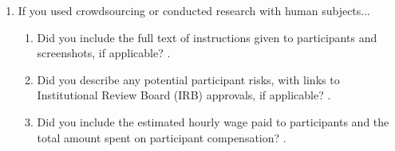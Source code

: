 \begin{enumerate}
\item If you used crowdsourcing or conducted research with human subjects...
\begin{enumerate}
  \item Did you include the full text of instructions given to participants and screenshots, if applicable?
    \answerNA{}.
  \item Did you describe any potential participant risks, with links to Institutional Review Board (IRB) approvals, if applicable?
    \answerNA{}.
  \item Did you include the estimated hourly wage paid to participants and the total amount spent on participant compensation?
    \answerNA{}.
\end{enumerate}

\end{enumerate}


